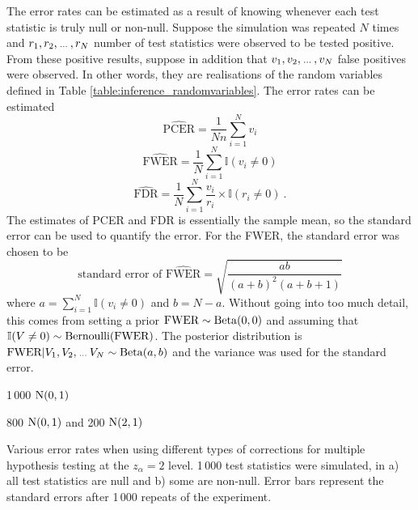 The error rates can be estimated as a result of knowing whenever each test statistic is truly null or non-null. Suppose the simulation was repeated $N$ times and $r_1,r_2,\dotdotdot,r_N$ number of test statistics were observed to be tested positive. From these positive results, suppose in addition that $v_1,v_2,\dotdotdot,v_N$ false positives were observed. In other words, they are realisations of the random variables defined in Table \ref{table:inference_randomvariables}. The error rates can be estimated
\begin{equation}
	\widehat{\text{PCER}} = \frac{1}{Nn}\sum_{i=1}^N v_i
\end{equation}
\begin{equation}
	\widehat{\text{FWER}} = \frac{1}{N} \sum_{i=1}^N \mathbb{I}(v_i\neq 0)
\end{equation}
\begin{equation}
	\widehat{\text{FDR}} = \frac{1}{N}\sum_{i=1}^N\dfrac{v_i}{r_i}\times\mathbb{I}(r_i\neq0)
	\ .
\end{equation}
The estimates of PCER and FDR is essentially the sample mean, so the standard error can be used to quantify the error. For the FWER, the standard error was chosen to be
\begin{equation}
	\text{standard error of }\widehat{\text{FWER}} = 
	\sqrt{\dfrac{ab}{(a+b)^2(a+b+1)}}
\end{equation}
where $a = \sum_{i=1}^N \mathbb{I}(v_i\neq 0)$ and $b = N - a$. Without going into too much detail, this comes from setting a prior $\text{FWER}\sim\operatorname{Beta}(0,0)$ and assuming that $\mathbb{I}(V\neq0)\sim\operatorname{Bernoulli}(\text{FWER})$. The posterior distribution is $\text{FWER}|V_1,V_2,\dotdotdot V_N\sim\betaDist(a,b)$ and the variance was used for the standard error.

\begin{table}
    \centering
    \begin{subtable}{\textwidth}
    	\centering
    	
    	\caption{1\,000 $\operatorname{N}(0,1)$}
    \end{subtable}
    \begin{subtable}{\textwidth}
    	\centering
    	
    	\caption{800 $\operatorname{N}(0,1)$ and 200 $\operatorname{N}(2,1)$}
    \end{subtable}
    \caption{Various error rates when using different types of corrections for multiple hypothesis testing at the $z_\alpha=2$ level. 1\,000 test statistics were simulated, in a) all test statistics are null and b) some are non-null. Error bars represent the standard errors after 1\,000 repeats of the experiment.}
    \label{table:inference_error_rate}
\end{table}

